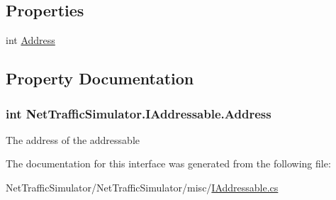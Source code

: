 \subsection*{Properties}
\begin{DoxyCompactItemize}
\item 
int \hyperlink{interfaceNetTrafficSimulator_1_1IAddressable_a2d51a1c5896f8830489ea144070472fa}{Address}
\end{DoxyCompactItemize}


\subsection{Property Documentation}
\hypertarget{interfaceNetTrafficSimulator_1_1IAddressable_a2d51a1c5896f8830489ea144070472fa}{
\subsubsection[{Address}]{\setlength{\rightskip}{0pt plus 5cm}int Net\-Traffic\-Simulator.\-I\-Addressable.\-Address\hspace{0.3cm}{\ttfamily [get]}}}\label{interfaceNetTrafficSimulator_1_1IAddressable_a2d51a1c5896f8830489ea144070472fa}
The address of the addressable 

The documentation for this interface was generated from the following file\-:\begin{DoxyCompactItemize}
\item 
Net\-Traffic\-Simulator/\-Net\-Traffic\-Simulator/misc/\hyperlink{IAddressable_8cs}{I\-Addressable.\-cs}\end{DoxyCompactItemize}
